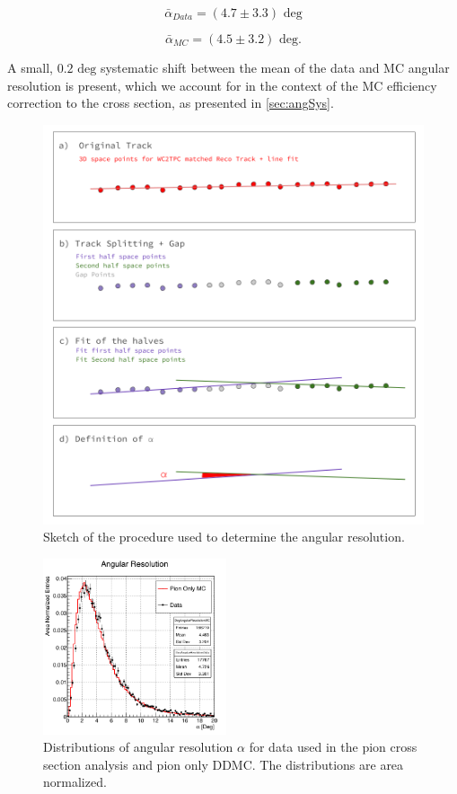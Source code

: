 \begin{equation}
\bar\alpha_{Data} = (4.7 \pm 3.3) \text{ deg} 
\end{equation}

\begin{equation}
\bar\alpha_{MC} = (4.5 \pm 3.2) \text{ deg}. 
\end{equation}

A small, $0.2 \text{ deg}$ systematic shift between the mean of the data and MC angular resolution is present, which we account for in the context of the MC efficiency correction to the cross section, as presented in \ref{sec:angSys}.


\begin{figure}[htb]
\centering
\includegraphics[width=\textwidth]{Studies/Figures/TrackingProcedure.png}
\caption[]{ Sketch of the procedure used to determine the angular resolution. } \label{fig:AngResProcedure}
\end{figure}


\begin{figure}[htb]
\centering
\includegraphics[width=0.48\textwidth]{Studies/Figures/cTrackingDeg.png}
\caption[]{Distributions of angular resolution $\alpha$ for data used in the pion cross section analysis and pion only DDMC. The distributions are area normalized. } \label{fig:trackingResolution}
\end{figure}


